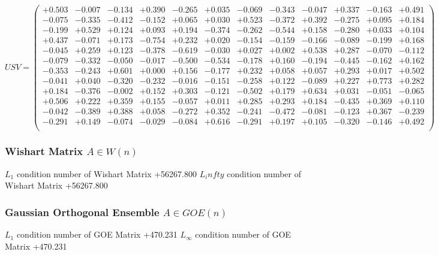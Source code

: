 \documentclass[9pt]{article}
\theoremstyle{plain}
\theoremstyle{definition}
\theoremstyle{remark}
\numberwithin{equation}{section}
\begin{document}
$U S V = \left(
\begin{array}{
cccccccccccc}
+0.503 & -0.007 & -0.134 & +0.390 & -0.265 & +0.035 & -0.069 & -0.343 & -0.047 & +0.337 & -0.163 & +0.491 \\
-0.075 & -0.335 & -0.412 & -0.152 & +0.065 & +0.030 & +0.523 & -0.372 & +0.392 & -0.275 & +0.095 & +0.184 \\
-0.199 & +0.529 & +0.124 & +0.093 & +0.194 & -0.374 & -0.262 & -0.544 & +0.158 & -0.280 & +0.033 & +0.104 \\
+0.437 & -0.071 & +0.173 & -0.754 & +0.232 & +0.020 & -0.154 & -0.159 & -0.166 & -0.089 & -0.199 & +0.168 \\
-0.045 & +0.259 & +0.123 & -0.378 & -0.619 & -0.030 & +0.027 & +0.002 & +0.538 & +0.287 & -0.070 & -0.112 \\
-0.079 & -0.332 & -0.050 & -0.017 & -0.500 & -0.534 & -0.178 & +0.160 & -0.194 & -0.445 & -0.162 & +0.162 \\
-0.353 & -0.243 & +0.601 & +0.000 & +0.156 & -0.177 & +0.232 & +0.058 & +0.057 & +0.293 & +0.017 & +0.502 \\
-0.041 & +0.040 & -0.320 & -0.232 & -0.016 & -0.151 & -0.258 & +0.122 & -0.089 & +0.227 & +0.773 & +0.282 \\
+0.184 & -0.376 & -0.002 & +0.152 & +0.303 & -0.121 & -0.502 & +0.179 & +0.634 & +0.031 & -0.051 & -0.065 \\
+0.506 & +0.222 & +0.359 & +0.155 & -0.057 & +0.011 & +0.285 & +0.293 & +0.184 & -0.435 & +0.369 & +0.110 \\
-0.042 & -0.389 & +0.388 & +0.058 & -0.272 & +0.352 & -0.241 & -0.472 & -0.081 & -0.123 & +0.367 & -0.239 \\
-0.291 & +0.149 & -0.074 & -0.029 & -0.084 & +0.616 & -0.291 & +0.197 & +0.105 & -0.320 & -0.146 & +0.492 \\
\end{array}
\right)$ \newline 

\subsubsection{Wishart Matrix $A \in W(n)$}
$L_1$ condition number of Wishart Matrix +56267.800
$L_infty$ condition number of Wishart Matrix +56267.800
\subsubsection{Gaussian Orthogonal Ensemble $A \in GOE(n)$}
$L_1$ condition number of GOE Matrix +470.231
$L_\infty$ condition number of GOE Matrix +470.231
\end{document}
